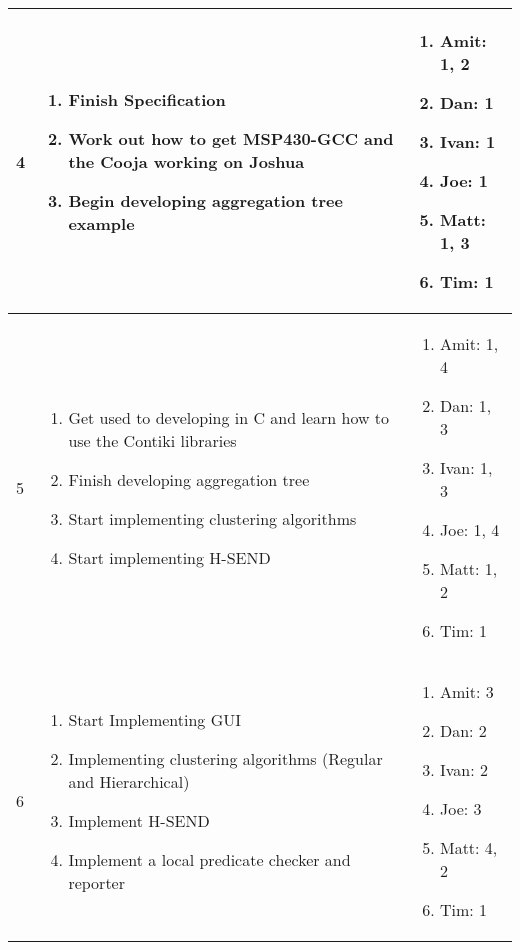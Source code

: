 \begin{center}
\begin{longtable}{| l | p{9cm} | p{3.5cm} |}
	
	4 & \begin{enumerate}
			\item Finish Specification
			\item Work out how to get MSP430-GCC and the Cooja working on Joshua
			\item Begin developing aggregation tree example
		\end{enumerate} &
	\begin{enumerate}
		\item[] Amit: 1, 2
		\item[] Dan: 1
		\item[] Ivan: 1
		\item[] Joe: 1
		\item[] Matt: 1, 3
		\item[] Tim: 1
	\end{enumerate}
	\\ \hline
	
	
	5 & \begin{enumerate}
			\item Get used to developing in C and learn how to use the Contiki libraries
			\item Finish developing aggregation tree
			\item Start implementing clustering algorithms
			\item Start implementing H-SEND
		\end{enumerate} &
	\begin{enumerate}
		\item[] Amit: 1, 4
		\item[] Dan: 1, 3
		\item[] Ivan: 1, 3
		\item[] Joe: 1, 4
		\item[] Matt: 1, 2
		\item[] Tim: 1
	\end{enumerate}
	\\ \hline
	
	
	6 & \begin{enumerate}
			\item Start Implementing GUI
			\item Implementing clustering algorithms (Regular and Hierarchical)
			\item Implement H-SEND
			\item Implement a local predicate checker and reporter
		\end{enumerate} &
	\begin{enumerate}
		\item[] Amit: 3
		\item[] Dan: 2
		\item[] Ivan: 2
		\item[] Joe: 3
		\item[] Matt: 4, 2
		\item[] Tim: 1
	\end{enumerate}
	\\ \hline
	

\end{longtable}
\end{center}
